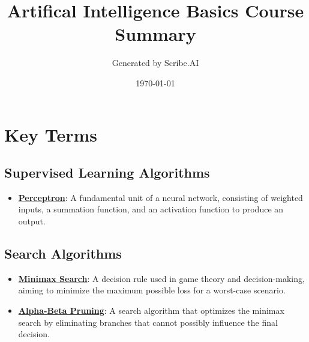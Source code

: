 \documentclass{article}%
\title{Artifical Intelligence Basics Course Summary}%
\author{Generated by Scribe.AI}%
\date{\today}%
\begin{document}
%
\normalsize%
\maketitle%
\section{Key Terms}%
\label{sec:KeyTerms}%
\subsection{Supervised Learning Algorithms}%
\label{subsec:SupervisedLearningAlgorithms}%
\begin{itemize}[leftmargin=*]%
\item \href{https://purdue.brightspace.com/d2l/common/assets/pdfjs-d2l-dist/1.0.14-legacy/web/viewer.html?file=\%2Fcontent\%2Fenforced\%2F1095467-wl.202510.CS.24300.001\%2F02L2-Intro.pdf\%3Fou\%3D1095467\&lang=en-us\&container=d2l-fileviewer-rendered-pdf\&fullscreen=d2l-fileviewer-rendered-pdf-dialog\&height=667#page=45}{\textbf{Perceptron}}: A fundamental unit of a neural network, consisting of weighted inputs, a summation function, and an activation function to produce an output.%
\end{itemize}

%
\subsection{Search Algorithms}%
\label{subsec:SearchAlgorithms}%
\begin{itemize}[leftmargin=*]%
\item \href{https://purdue.brightspace.com/d2l/common/assets/pdfjs-d2l-dist/1.0.14-legacy/web/viewer.html?file=\%2Fcontent\%2Fenforced\%2F1095467-wl.202510.CS.24300.001\%2F02L2-Intro.pdf\%3Fou\%3D1095467\&lang=en-us\&container=d2l-fileviewer-rendered-pdf\&fullscreen=d2l-fileviewer-rendered-pdf-dialog\&height=667#page=22}{\textbf{Minimax Search}}: A decision rule used in game theory and decision{-}making, aiming to minimize the maximum possible loss for a worst{-}case scenario.%
\item \href{https://purdue.brightspace.com/d2l/common/assets/pdfjs-d2l-dist/1.0.14-legacy/web/viewer.html?file=\%2Fcontent\%2Fenforced\%2F1095467-wl.202510.CS.24300.001\%2F02L2-Intro.pdf\%3Fou\%3D1095467\&lang=en-us\&container=d2l-fileviewer-rendered-pdf\&fullscreen=d2l-fileviewer-rendered-pdf-dialog\&height=667#page=23}{\textbf{Alpha{-}Beta Pruning}}: A search algorithm that optimizes the minimax search by eliminating branches that cannot possibly influence the final decision.%
\end{itemize}
\end{document}
